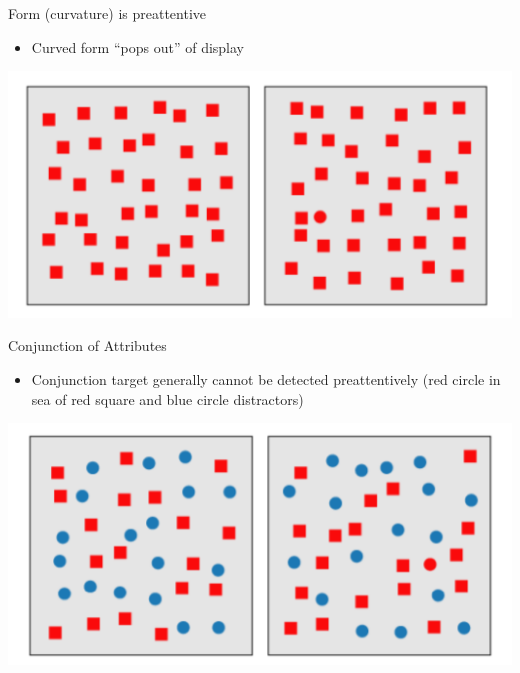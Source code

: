 \documentclass{beamer}
\begin{document}
\begin{frame}{Form (curvature) is preattentive} 
    \begin{itemize}
        \item Curved form ``pops out'' of display
    \end{itemize}
    \begin{center}
        \includegraphics[scale=0.4]{preattentive2.png}
    \end{center}
\end{frame}  

\begin{frame}{Conjunction of Attributes} 
    \begin{itemize}
        \item Conjunction target generally cannot be detected preattentively (red circle in sea of red square and blue circle distractors)
    \end{itemize}
    \begin{center}
        \includegraphics[scale=0.4]{preattentive3.png}
    \end{center}
\end{frame}  
\end{document}

